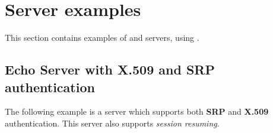 

\section{Server examples}
This section contains examples of \tls{} and \ssl{} servers, using \gnutls{}.

\subsection{Echo Server with X.509 and SRP authentication}
The following example is a server which supports both {\bf SRP} and {\bf X.509} authentication.
This server also supports {\it session resuming}.

